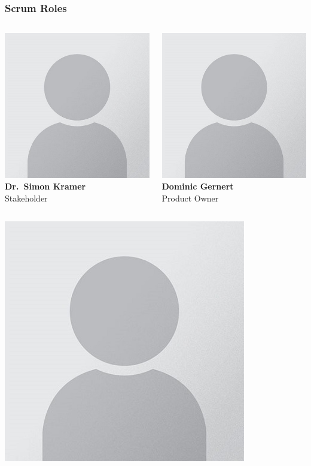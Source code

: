 \begin{frame}
    \frametitle{Scrum Roles}
    \begin{columns}
        \centering
        \includegraphics[width=0.45\linewidth]{../assets/avatar_placeholder.jpg} \\
        \textbf{Dr.\ Simon Kramer} \\ \small{Stakeholder} \par\vspace{0.5cm}
        \centering
        \includegraphics[width=0.45\linewidth]{../assets/avatar_placeholder.jpg} \\
        \textbf{Dominic Gernert} \\ \small{Product Owner} \par\vspace{0.5cm}
    \end{columns}
    \begin{columns}
        \centering
        \includegraphics[width=0.45\linewidth]{../assets/avatar_placeholder.jpg} \\

\end{columns}
\end{frame}
